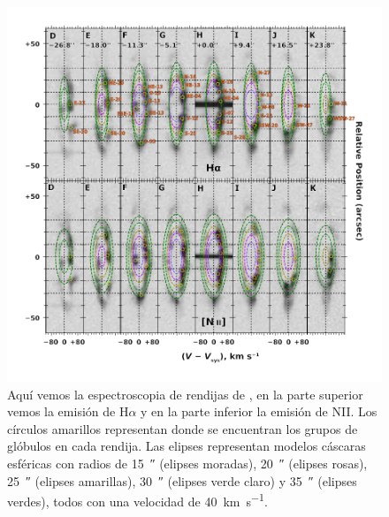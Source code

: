 \documentclass{book}
\begin{document}
\begin{figure}[htb]
    \centering
    \includegraphics[width=\textwidth]{Nuevas imagenes finales/zavala-slit-spectra-select-annotated.pdf}
    \caption{Aquí vemos la espectroscopia de rendijas de \cite{Zavala:2022}, en la parte superior vemos la emisión de H$\alpha$ y en la parte inferior la emisión de NII. Los círculos amarillos representan donde se encuentran los grupos de glóbulos en cada rendija. Las elipses representan modelos cáscaras esféricas con radios de \SI{15}{\arcsecond} (elipses moradas), \SI{20}{\arcsecond} (elipses rosas), \SI{25}{\arcsecond} (elipses amarillas), \SI{30}{\arcsecond} (elipses verde claro) y \SI{35}{\arcsecond} (elipses verdes), todos con una velocidad de \SI{40}{km.s^{-1}}.}
    \label{fig:zavala_nudos}
\end{figure}
\end{document}
